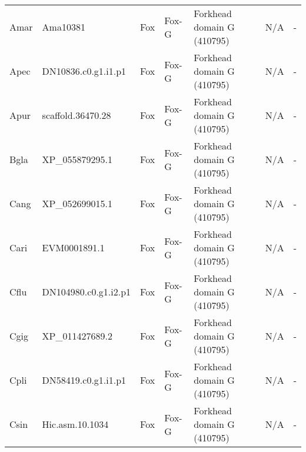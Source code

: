 \documentclass[../main.tex]{subfiles}
\begin{document}
\begin{landscape}
\begin{longtable}{lllllll}
		Amar           & Ama10381              & Fox            & Fox-G               & Forkhead domain G (410795)                  & N/A                                                                    & -                    \\
		Apec           & DN10836.c0.g1.i1.p1   & Fox            & Fox-G               & Forkhead domain G (410795)                  & N/A                                                                    & -                    \\
		Apur           & scaffold.36470.28     & Fox            & Fox-G               & Forkhead domain G (410795)                  & N/A                                                                    & -                    \\
		Bgla           & XP\_055879295.1       & Fox            & Fox-G               & Forkhead domain G (410795)                  & N/A                                                                    & -                    \\
		Cang           & XP\_052699015.1       & Fox            & Fox-G               & Forkhead domain G (410795)                  & N/A                                                                    & -                    \\
		Cari           & EVM0001891.1          & Fox            & Fox-G               & Forkhead domain G (410795)                  & N/A                                                                    & -                    \\
		Cflu           & DN104980.c0.g1.i2.p1  & Fox            & Fox-G               & Forkhead domain G (410795)                  & N/A                                                                    & -                    \\
		Cgig           & XP\_011427689.2       & Fox            & Fox-G               & Forkhead domain G (410795)                  & N/A                                                                    & -                    \\
		Cpli           & DN58419.c0.g1.i1.p1   & Fox            & Fox-G               & Forkhead domain G (410795)                  & N/A                                                                    & -                    \\
		Csin           & Hic.asm.10.1034       & Fox            & Fox-G               & Forkhead domain G (410795)                  & N/A                                                                    & -                    \\

\end{longtable}
\end{landscape}
\end{document}
